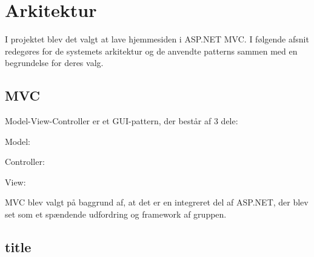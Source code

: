 \chapter{Arkitektur}

I projektet blev det valgt at lave hjemmesiden i ASP.NET MVC. I følgende afsnit redegøres for de systemets arkitektur og de anvendte patterns sammen med en begrundelse for deres valg.

\section{MVC}
Model-View-Controller er et GUI-pattern, der består af 3 dele:

Model: 

Controller:

View:

MVC blev valgt på baggrund af, at det er en integreret del af ASP.NET, der blev set som et spændende udfordring og framework af gruppen. 

\section{title}
